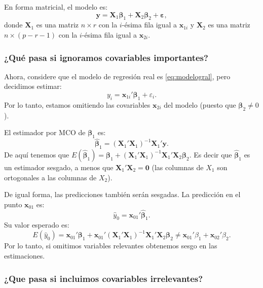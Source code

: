 \documentclass[
]{article}
\begin{document}
En forma matricial, el modelo es:
\[
\boldsymbol y= \boldsymbol X_{1}\boldsymbol \beta_{1} + \boldsymbol X_{2}\boldsymbol \beta_{2}+ \boldsymbol \varepsilon,
\]
donde \(\boldsymbol X_{1}\) es una matriz \(n \times r\) con la \(i\)-ésima fila igual a \(\boldsymbol x_{1i}\) y \(\boldsymbol X_{2}\) es una matriz \(n \times (p-r-1)\) con la \(i\)-ésima fila igual a \(\boldsymbol x_{2i}\).

\hypertarget{quuxe9-pasa-si-ignoramos-covariables-importantes}{%
\subsubsection{¿Qué pasa si ignoramos covariables importantes?}\label{quuxe9-pasa-si-ignoramos-covariables-importantes}}

Ahora, considere que el modelo de regresión real es \eqref{eq:modelogral}, pero decidimos estimar:
\[
y_{i} = \boldsymbol x_{1i}'\boldsymbol \beta_1 + \varepsilon_i.
\]
Por lo tanto, estamos omitiendo las covariables \(\boldsymbol x_{2i}\) del modelo (puesto que \(\boldsymbol \beta_2 \neq 0\)).

El estimador por MCO de \(\boldsymbol \beta_1\) es:
\[
\widehat{\boldsymbol \beta}_{1} = (\boldsymbol X_{1}'\boldsymbol X_{1})^{-1}\boldsymbol X_{1}'\boldsymbol y.
\]
De aquí tenemos que \(E(\widehat{\boldsymbol \beta}_{1}) = \boldsymbol \beta_{1} + (\boldsymbol X_{1}'\boldsymbol X_{1})^{-1}\boldsymbol X_{1}'\boldsymbol X_{2}\boldsymbol \beta_{2}\). Es decir que \(\widehat{\boldsymbol \beta}_{1}\) es un estimador sesgado, a menos que \(\boldsymbol X_{1}'\boldsymbol X_{2} = \boldsymbol 0\) (las columnas de \(X_{1}\) son ortogonales a las columnas de \(X_{2}\)).

De igual forma, las predicciones también serán sesgadas. La predicción en el punto \(\boldsymbol x_{01}\) es:
\[
\widehat{y}_{0} = \boldsymbol x_{01}'\widehat{\boldsymbol \beta}_{1}.
\]
Su valor esperado es:
\[
E(\widehat{y}_{0}) = \boldsymbol x_{01}'\boldsymbol \beta_{1} + \boldsymbol x_{01}'(\boldsymbol X_{1}'\boldsymbol X_{1})^{-1}\boldsymbol X_{1}'\boldsymbol X_{2}\boldsymbol \beta_{2} \neq \boldsymbol x_{01}'\beta_{1} + \boldsymbol x_{02}'\beta_{2}.
\]
Por lo tanto, si omitimos variables relevantes obtenemos sesgo en las estimaciones.

\hypertarget{que-pasa-si-incluimos-covariables-irrelevantes}{%
\subsubsection{¿Que pasa si incluimos covariables irrelevantes?}\label{que-pasa-si-incluimos-covariables-irrelevantes}}
\end{document}
